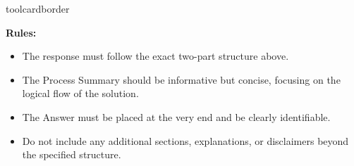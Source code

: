 \begin{custombox}[title=Instruction for {Solution Generator}]{toolcardborder}
\vspace{6pt}

\noindent\textbf{Rules:}
\begin{itemize}[left=0pt, label={}, itemsep=0pt, parsep=0pt]
 \item The response must follow the exact two-part structure above.
    
 \item The {Process Summary} should be informative but concise, focusing on the logical flow of the solution.
    
 \item The {Answer} must be placed at the very end and be clearly identifiable.
    
 \item Do not include any additional sections, explanations, or disclaimers beyond the specified structure.
\end{itemize}
\end{custombox}
